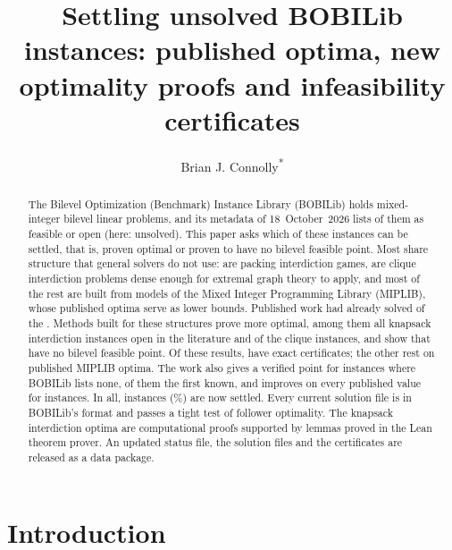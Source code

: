 \documentclass[]{spie}  %
\title{Settling \NumSettled{} unsolved BOBILib instances: \NumLitOptimal{} published optima,
\NumNewOptimal{} new optimality proofs and \NumNoFeasible{} infeasibility certificates}
\author{Brian J. Connolly\textsuperscript{*}}
\affil{Beehive Industries}
\theoremstyle{plain}
\begin{document}
\maketitle

\begin{abstract}
The Bilevel Optimization (Benchmark) Instance Library (BOBILib) holds \NumInstances{}
mixed-integer bilevel linear problems, and its metadata of 18~October~2026 lists \NumUnsolved{}
of them as feasible or open (here: unsolved). This paper asks which of these instances can be settled, that is, proven optimal or proven
to have no bilevel feasible point. Most share structure that general solvers do not use:
\NumPacking{} are packing interdiction games, \NumCliqueUnsolved{} are clique interdiction problems
dense enough for extremal graph theory to apply, and most of the rest are built from models of the
Mixed Integer Programming Library (MIPLIB), whose published optima serve as lower bounds. Published
work had already solved \NumLitOptimal{} of the \NumUnsolved{}. Methods built for these structures
prove \NumNewOptimal{} more optimal, among them all \NumNewKip{} knapsack interdiction instances
open in the literature and \NumNewClique{} of the \NumCliqueSet{} clique instances, and show that
\NumNoFeasible{} have no bilevel feasible point. Of these \NumSettledHere{} results,
\NumClassExactSettled{} have exact certificates; the other \NumClassNumericalNew{} rest on published
MIPLIB optima. The work also gives a verified point for \NumFirstPoint{} instances where BOBILib
lists none, \NumFirstAnywhere{} of them the first known, and improves on every published value for
\NumOrBetter{} instances. In all, \NumSettled{} instances (\PctSettled\%) are now settled. Every
current solution file is in BOBILib's format and passes a tight test of follower optimality. The knapsack
interdiction optima are computational proofs supported by lemmas proved in the Lean theorem prover.
An updated status file, the solution files and the certificates are released as a data package.
\end{abstract}


\section{Introduction}\label{sec:intro}
\end{document}
